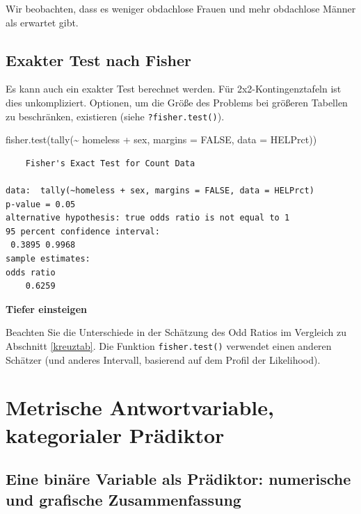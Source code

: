 \documentclass[
  ngerman,
]{scrbook}
\newenvironment{Shaded}{\begin{snugshade}}{\end{snugshade}}
\newcommand{\AttributeTok}[1]{\textcolor[rgb]{0.77,0.63,0.00}{#1}}
\newcommand{\ConstantTok}[1]{\textcolor[rgb]{0.00,0.00,0.00}{#1}}
\newcommand{\FunctionTok}[1]{\textcolor[rgb]{0.00,0.00,0.00}{#1}}
\newcommand{\NormalTok}[1]{#1}
\newcommand{\SpecialCharTok}[1]{\textcolor[rgb]{0.00,0.00,0.00}{#1}}
\newenvironment{tiefereinsteigen}[1]
  {
  \begin{itemize}
  \renewcommand{\labelitemi}{
    \raisebox{2.6\height}[0pt][0pt]{
      {\setkeys{Gin}{width=7em,keepaspectratio}
        {\normalsize \textcolor{dark-fom-green}\faSearch}}
        }
  }
  \begin{blackbox}
         \bgroup\color{dark-fom-green}
          {\textbf{Tiefer einsteigen}}
        \egroup
  \item
  }
  {
  \end{blackbox}
  \end{itemize}
  }
\begin{document}
Wir beobachten, dass es weniger obdachlose Frauen und mehr obdachlose Männer als erwartet gibt.

\hypertarget{exakter-test-nach-fisher}{%
\section{Exakter Test nach Fisher}\label{exakter-test-nach-fisher}}

Es kann auch ein exakter Test berechnet werden. Für 2x2-Kontingenztafeln ist dies unkompliziert. Optionen, um die Größe des Problems bei größeren Tabellen zu beschränken, existieren (siehe \texttt{?fisher.test()}).

\begin{Shaded}
\begin{Highlighting}[]
\FunctionTok{fisher.test}\NormalTok{(}\FunctionTok{tally}\NormalTok{(}\SpecialCharTok{\textasciitilde{}}\NormalTok{ homeless }\SpecialCharTok{+}\NormalTok{ sex, }\AttributeTok{margins =} \ConstantTok{FALSE}\NormalTok{, }
                     \AttributeTok{data =}\NormalTok{ HELPrct))}
\end{Highlighting}
\end{Shaded}

\begin{verbatim}
    Fisher's Exact Test for Count Data

data:  tally(~homeless + sex, margins = FALSE, data = HELPrct)
p-value = 0.05
alternative hypothesis: true odds ratio is not equal to 1
95 percent confidence interval:
 0.3895 0.9968
sample estimates:
odds ratio 
    0.6259 
\end{verbatim}

\begin{tiefereinsteigen}{tiefereinsteigen}
Beachten Sie die Unterschiede in der Schätzung des Odd Ratios im Vergleich zu Abschnitt \ref{kreuztab}. Die Funktion \texttt{fisher.test()} verwendet einen anderen Schätzer (und anderes Intervall, basierend auf dem Profil der Likelihood).

\end{tiefereinsteigen}

\hypertarget{metrische-antwortvariable-kategorialer-pruxe4diktor}{%
\chapter{Metrische Antwortvariable, kategorialer Prädiktor}\label{metrische-antwortvariable-kategorialer-pruxe4diktor}}

\hypertarget{eine-binuxe4re-variable-als-pruxe4diktor-numerische-und-grafische-zusammenfassung}{%
\section{Eine binäre Variable als Prädiktor: numerische und grafische Zusammenfassung}\label{eine-binuxe4re-variable-als-pruxe4diktor-numerische-und-grafische-zusammenfassung}}
\end{document}
